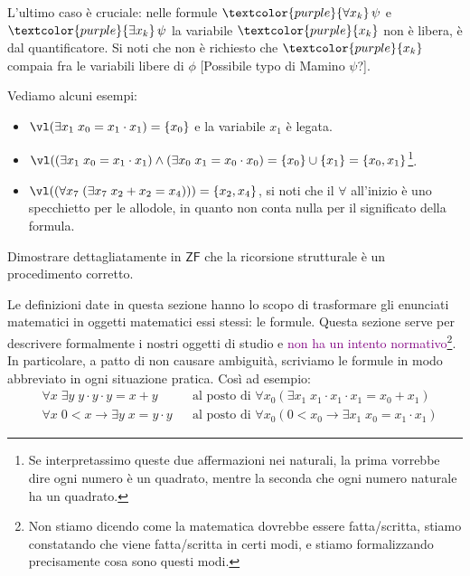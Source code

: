 \begin{remark}
    L'ultimo caso è cruciale: nelle formule $\textcolor{purple}{\forall x_k} \, \psi$ e $\textcolor{purple}{\exists x_k} \, \psi$ la variabile $\textcolor{purple}{x_k}$ non è libera, è  dal quantificatore.
    Si noti che non è richiesto che $\textcolor{purple}{x_k}$ compaia fra le variabili libere di $\phi$ [Possibile typo di Mamino $\psi$?].
\end{remark}

\begin{example}
    Vediamo alcuni esempi:
    \begin{itemize}[$\diamondsuit$]
        \item $\vl(\exists x_1 \; x_0 = x_1 \cdot x_1) = \{x_0\}$ e la variabile $x_1$ è legata.
        \item $\vl((\exists x_1 \; x_0 = x_1 \cdot x_1) \land (\exists x_0 \; x_1 = x_0 \cdot x_0) = \{x_0\} \cup \{x_1\} = \{x_0,x_1\}$\footnote{Se interpretassimo queste due affermazioni nei naturali, la prima vorrebbe dire ogni numero è un quadrato, mentre la seconda che ogni numero naturale ha un quadrato.}.
        \item $\vl((\forall x_7 \; (\exists x_7 \; x_2 + x_2 = x_4))) = \{x_2,x_4\}$, si noti che il $\forall$ all'inizio è uno specchietto per le allodole, in quanto non conta nulla per il significato della formula.
    \end{itemize}
\end{example}

\begin{exercise}
    Dimostrare dettagliatamente in $\mathsf{ZF}$ che la ricorsione strutturale è un procedimento corretto.
\end{exercise}

\begin{note}
    Le definizioni date in questa sezione hanno lo scopo di trasformare gli enunciati matematici in oggetti matematici essi stessi: le formule.
    Questa sezione serve per descrivere formalmente i nostri oggetti di studio e \textcolor{purple}{non ha un intento normativo}\footnote{Non stiamo dicendo come 
    la matematica dovrebbe essere fatta/scritta, stiamo constatando che viene fatta/scritta in certi modi, e stiamo formalizzando precisamente cosa sono questi modi.}.
    In particolare, a patto di non causare ambiguità, scriviamo le formule in modo abbreviato in ogni situazione pratica. Così ad esempio:
    \begin{align*}
        &\forall x\; \exists y \; y \cdot y \cdot y = x + y &&\text{al posto di  $\forall x_0(\exists x_1 \; x_1 \cdot x_1 \cdot x_1 = x_0 + x_1)$} \\
        &\forall x\; 0 < x \to \exists y \; x = y \cdot y &&\text{al posto di $\forall x_0(0 < x_0 \to \exists x_1 \; x_0 = x_1 \cdot x_1)$}
    \end{align*}
\end{note}

